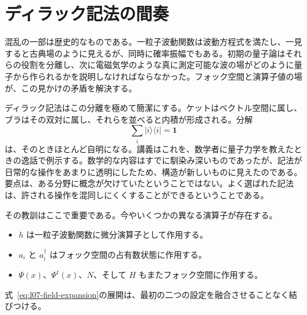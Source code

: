 \begin{classroomqa}
\end{classroomqa}

\section{ディラック記法の間奏}

混乱の一部は歴史的なものである。一粒子波動関数は波動方程式を満たし、一見すると古典場のように見えるが、同時に確率振幅でもある。初期の量子論はそれらの役割を分離し、次に電磁気学のような真に測定可能な波の場がどのように量子から作られるかを説明しなければならなかった。フォック空間と演算子値の場が、この見かけの矛盾を解決する。

ディラック記法はこの分離を極めて簡潔にする。ケットはベクトル空間に属し、ブラはその双対に属し、それらを並べると内積が形成される。分解
\begin{equation}
\sum_i|i\rangle\langle i|=\mathbf 1
\end{equation}
は、そのときほとんど自明になる。講義はこれを、数学者に量子力学を教えたときの逸話で例示する。数学的な内容はすでに馴染み深いものであったが、記法が日常的な操作をあまりに透明にしたため、構造が新しいものに見えたのである。要点は、ある分野に概念が欠けていたということではない。よく選ばれた記法は、許される操作を混同しにくくすることができるということである。

その教訓はここで重要である。今やいくつかの異なる演算子が存在する。
\begin{itemize}
\item \(h\) は一粒子波動関数に微分演算子として作用する。
\item \(a_i\) と \(a_i^\dagger\) はフォック空間の占有数状態に作用する。
\item \(\Psi(x)\)、\(\Psi^\dagger(x)\)、\(N\)、そして \(H\) もまたフォック空間に作用する。
\end{itemize}
式~\eqref{eq:l07-field-expansion}の展開は、最初の二つの設定を融合させることなく結びつける。

\begin{classroomqa}
\end{classroomqa}

